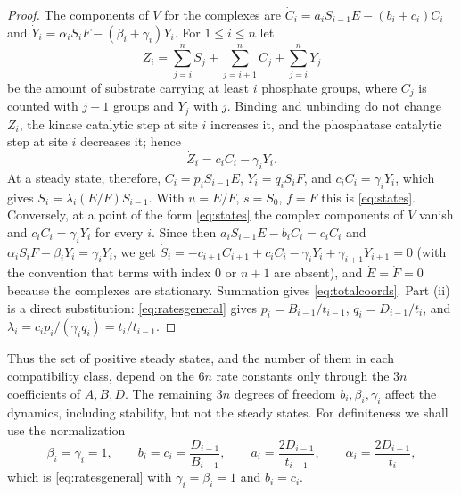 \documentclass[11pt]{article}
\theoremstyle{plain}
\theoremstyle{definition}
\theoremstyle{remark}
\numberwithin{equation}{section}
\begin{document}
\begin{proof}
The components of \(V\) for the complexes are
\(\dot C_i=a_iS_{i-1}E-(b_i+c_i)C_i\) and \(\dot Y_i=\alpha_iS_iF-(\beta_i+\gamma_i)Y_i\). For
\(1\le i\le n\) let
\begin{equation}\label{eq:pools}
 Z_i=\sum_{j=i}^n S_j+\sum_{j=i+1}^n C_j+\sum_{j=i}^n Y_j
\end{equation}
be the amount of substrate carrying at least \(i\) phosphate groups, where \(C_j\) is counted
with \(j-1\) groups and \(Y_j\) with \(j\). Binding and unbinding do not change \(Z_i\), the
kinase catalytic step at site \(i\) increases it, and the phosphatase catalytic step at site
\(i\) decreases it; hence
\begin{equation}\label{eq:poolcurrent}
 \dot Z_i=c_iC_i-\gamma_iY_i .
\end{equation}
At a steady state, therefore, \(C_i=p_iS_{i-1}E\), \(Y_i=q_iS_iF\), and \(c_iC_i=\gamma_iY_i\),
which gives \(S_i=\lambda_i(E/F)S_{i-1}\). With \(u=E/F\), \(s=S_0\), \(f=F\) this is
\eqref{eq:states}. Conversely, at a point of the form \eqref{eq:states} the complex
components of \(V\) vanish and \(c_iC_i=\gamma_iY_i\) for every \(i\). Since then
\(a_iS_{i-1}E-b_iC_i=c_iC_i\) and \(\alpha_iS_iF-\beta_iY_i=\gamma_iY_i\), we get
\(\dot S_i=-c_{i+1}C_{i+1}+c_iC_i-\gamma_iY_i+\gamma_{i+1}Y_{i+1}=0\) (with the convention
that terms with index \(0\) or \(n+1\) are absent), and \(\dot E=\dot F=0\) because the
complexes are stationary. Summation gives \eqref{eq:totalcoords}. Part (ii) is a direct
substitution: \eqref{eq:ratesgeneral} gives \(p_i=B_{i-1}/t_{i-1}\), \(q_i=D_{i-1}/t_i\), and
\(\lambda_i=c_ip_i/(\gamma_iq_i)=t_i/t_{i-1}\).
\end{proof}

Thus the set of positive steady states, and the number of them in each compatibility class,
depend on the \(6n\) rate constants only through the \(3n\) coefficients of \(A,B,D\). The
remaining \(3n\) degrees of freedom \(b_i,\beta_i,\gamma_i\) affect the dynamics, including
stability, but not the steady states. For definiteness we shall use the normalization
\begin{equation}\label{eq:rates}
 \beta_i=\gamma_i=1,\qquad b_i=c_i=\frac{D_{i-1}}{B_{i-1}},\qquad
 a_i=\frac{2D_{i-1}}{t_{i-1}},\qquad \alpha_i=\frac{2D_{i-1}}{t_i},
\end{equation}
which is \eqref{eq:ratesgeneral} with \(\gamma_i=\beta_i=1\) and \(b_i=c_i\).
\end{document}
